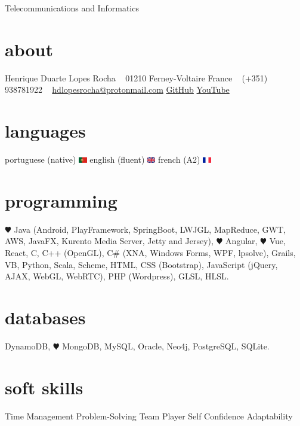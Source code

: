 \documentclass[]{friggeri-cv}
\begin{document}
       {Telecommunications and Informatics}

\begin{aside}
  \section{about}
    Henrique Duarte Lopes Rocha
    ~
    01210 Ferney-Voltaire
    France
    ~
    (+351) 938781922
    ~
    \href{mailto:hdlopesrocha@protonmail.com}{hdlopesrocha@protonmail.com}
    \href{https://github.com/hdlopesrocha}{GitHub}
    \href{http://www.youtube.com/user/hdlopesrocha}{YouTube}
  \section{languages}
    portuguese (native) \includegraphics[width=10pt]{pt}
    english (fluent) \includegraphics[width=10pt]{uk}
    french (A2) \includegraphics[width=10pt]{fr}
  \section{programming}
    {\color{red} $\varheartsuit$} Java
	(Android, PlayFramework, SpringBoot, LWJGL, MapReduce, GWT, AWS, JavaFX, Kurento Media Server, Jetty and Jersey), 
	{\color{green} $\varheartsuit$} Angular, {\color{green} $\varheartsuit$} Vue, React, C, C++ (OpenGL), C\# (XNA, Windows Forms, WPF, lpsolve), Grails, VB, Python, Scala, Scheme, 
	HTML, CSS (Bootstrap), JavaScript (jQuery, AJAX, WebGL, WebRTC), PHP (Wordpress), GLSL, HLSL.
\section{databases}
	DynamoDB, {\color{green} $\varheartsuit$} MongoDB, MySQL, Oracle, Neo4j, PostgreSQL, SQLite.
   \section{soft skills}
	Time Management
	Problem-Solving
	Team Player
	Self Confidence
	Adaptability
\end{aside}
\end{document}
